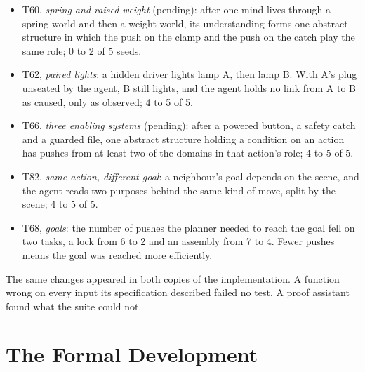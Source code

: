 \documentclass[11pt]{article}
\theoremstyle{remark}
\begin{document}
\begin{itemize}[nosep]
    \item T60, \emph{spring and raised weight} (pending): after one mind lives through a
    spring world and then a weight world, its understanding forms one abstract structure in
    which the push on the clamp and the push on the catch play the same role; 0 to 2 of 5
    seeds.
    \item T62, \emph{paired lights}: a hidden driver lights lamp A, then lamp B. With A's
    plug unseated by the agent, B still lights, and the agent holds no link from A to B as
    caused, only as observed; 4 to 5 of 5.
    \item T66, \emph{three enabling systems} (pending): after a powered button, a safety
    catch and a guarded file, one abstract structure holding a condition on an action has
    pushes from at least two of the domains in that action's role; 4 to 5 of 5.
    \item T82, \emph{same action, different goal}: a neighbour's goal depends on the scene,
    and the agent reads two purposes behind the same kind of move, split by the scene; 4 to
    5 of 5.
    \item T68, \emph{goals}: the number of pushes the planner needed to reach the goal fell
    on two tasks, a lock from 6 to 2 and an assembly from 7 to 4. Fewer pushes means the
    goal was reached more efficiently.
\end{itemize}

The same changes appeared in both copies of the implementation. A function wrong on every
input its specification described failed no test. A proof assistant found what the suite
could not.

\section{The Formal Development}
\label{app:files}
\end{document}
